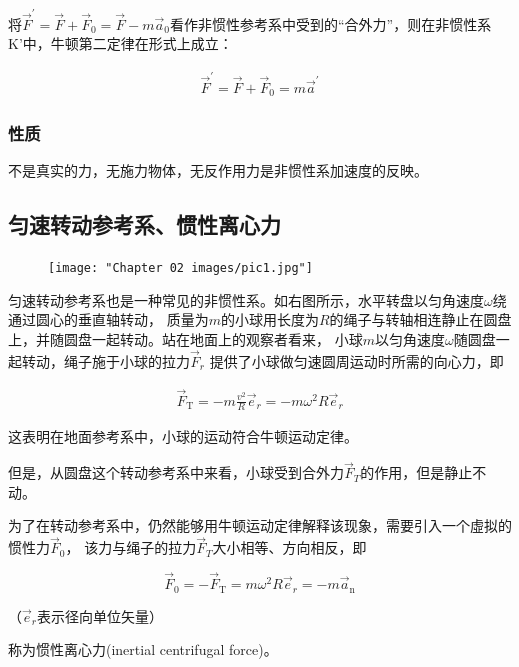 \documentclass[
	12pt, %
	a4paper, %
]{myLegrandOrangeBook}
\begin{document}
    将\(\overrightarrow{F}^{'} = \overrightarrow{F} + \overrightarrow{F}_{0} = \overrightarrow{F} -
    m \overrightarrow{a}_{0}\)看作非惯性参考系中受到的“合外力”，则在非惯性系K'中，牛顿第二定律在形式上成立：

    \begin{align}
        \overrightarrow{F}^{'} = \overrightarrow{F} + \overrightarrow{F}_{0} = m \overrightarrow{a}^{'}
    \end{align}

\subsubsection*{性质}

    不是真实的力，无施力物体，无反作用力是非惯性系加速度的反映。

\subsection{匀速转动参考系、惯性离心力}
    
    \begin{figure}
        \centering
        \texttt{[image: "Chapter 02 images/pic1.jpg"]}
        \label{pic1}
    \end{figure}

    匀速转动参考系也是一种常见的非惯性系。如右图所示，水平转盘以匀角速度\(\omega\)绕通过圆心的垂直轴转动，
    质量为\(m\)的小球用长度为\(R\)的绳子与转轴相连静止在圆盘上，并随圆盘一起转动。站在地面上的观察者看来，
    小球\(m\)以匀角速度\(\omega\)随圆盘一起转动，绳子施于小球的拉力\(\overrightarrow{F}_{r}\)
    提供了小球做匀速圆周运动时所需的向心力，即

    \begin{align}
        \overrightarrow{F}_{\mathrm{T}}=-m \frac{v^2}{R} \overrightarrow{e}_r=-m \omega^2 R \overrightarrow{e}_r
    \end{align}

    这表明在地面参考系中，小球的运动符合牛顿运动定律。

    但是，从圆盘这个转动参考系中来看，小球受到合外力\(\overrightarrow{F}_{T}\)的作用，但是静止不动。
    
    \vspace{1em}
    \begin{definition}[平动惯性力]
        
        为了在转动参考系中，仍然能够用牛顿运动定律解释该现象，需要引入一个虛拟的惯性力\(\overrightarrow{F}_{0}\)，
        该力与绳子的拉力\(\overrightarrow{F}_{T}\)大小相等、方向相反，即

        \begin{equation}
            \overrightarrow{F}_0=-\overrightarrow{F}_{\mathrm{T}}=m \omega^2 R \overrightarrow{e}_r=-m \overrightarrow{a}_{\mathrm{n}}
        \end{equation}

        （\(\overrightarrow{e}_r\)表示径向单位矢量）

        称为惯性离心力(inertial centrifugal force)。

    \end{definition}
\end{document}
